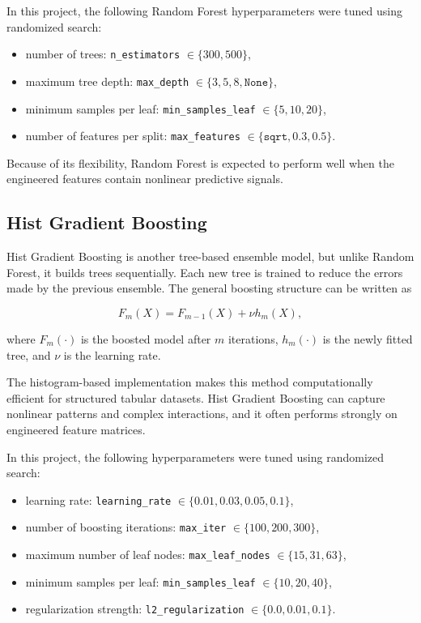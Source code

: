 \documentclass[12pt]{article}
\begin{document}
In this project, the following Random Forest hyperparameters were tuned using randomized search:

\begin{itemize}
    \item number of trees: \texttt{n\_estimators} $\in \{300, 500\}$,
    \item maximum tree depth: \texttt{max\_depth} $\in \{3, 5, 8, \texttt{None}\}$,
    \item minimum samples per leaf: \texttt{min\_samples\_leaf} $\in \{5, 10, 20\}$,
    \item number of features per split: \texttt{max\_features} $\in \{\texttt{sqrt}, 0.3, 0.5\}$.
\end{itemize}

Because of its flexibility, Random Forest is expected to perform well when the engineered features contain nonlinear predictive signals.

\subsection{Hist Gradient Boosting}

Hist Gradient Boosting is another tree-based ensemble model, but unlike Random Forest, it builds trees sequentially. Each new tree is trained to reduce the errors made by the previous ensemble. The general boosting structure can be written as

\begin{equation}
F_m(X) = F_{m-1}(X) + \nu h_m(X),
\end{equation}

where $F_m(\cdot)$ is the boosted model after $m$ iterations, $h_m(\cdot)$ is the newly fitted tree, and $\nu$ is the learning rate.

The histogram-based implementation makes this method computationally efficient for structured tabular datasets. Hist Gradient Boosting can capture nonlinear patterns and complex interactions, and it often performs strongly on engineered feature matrices.

In this project, the following hyperparameters were tuned using randomized search:

\begin{itemize}
    \item learning rate: \texttt{learning\_rate} $\in \{0.01, 0.03, 0.05, 0.1\}$,
    \item number of boosting iterations: \texttt{max\_iter} $\in \{100, 200, 300\}$,
    \item maximum number of leaf nodes: \texttt{max\_leaf\_nodes} $\in \{15, 31, 63\}$,
    \item minimum samples per leaf: \texttt{min\_samples\_leaf} $\in \{10, 20, 40\}$,
    \item regularization strength: \texttt{l2\_regularization} $\in \{0.0, 0.01, 0.1\}$.
\end{itemize}
\end{document}
